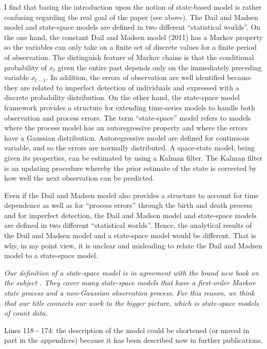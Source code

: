 \documentclass[12pt,english]{article}
\begin{document}
\begin{spacing}{1.9}
\begin{flushleft}
I find that basing the introduction upon the notion of state-based model is rather confusing
regarding the real goal of the paper (see above). The Dail and Madsen model and state-space
models are defined in two different ``statistical worlds''. On the one hand, the constant
Dail and Madsen model (2011) has a Markov property so the variables can only take on a
finite set of discrete values for a finite period of observation. The distinguish feature of
Markov chains is that the conditional probability of $x_{t}$ given the entire past depends only on
the immediately preceding variable $x_{t-1}$. In addition, the errors of observation are well
identified because they are related to imperfect detection of individuals and expressed with
a discrete probability distribution. On the other hand, the state-space model framework
provides a structure for extending time-series models to handle both observation and
process errors. The term ``state-space'' model refers to models where the process model has
an autoregressive property and where the errors have a Gaussian distribution.
Autoregressive model are defined for continuous variable, and so the errors are normally
distributed. A space-state model, being given its properties, can be estimated by using a
Kalman filter. The Kalman filter is an updating procedure whereby the prior estimate of the
state is corrected by how well the next observation can be predicted.

Even if the Dail and Madsen model also provides a structure to account for time dependence
as well as for ``process errors'' through the birth and death process and for imperfect
detection, the Dail and Madsen model and state-space models are defined in two different
``statistical worlds''. Hence, the analytical results of the Dail and Madsen model and a state-space
model would be different. That is why, in my point view, it is unclear and misleading to
relate the Dail and Madsen model to a state-space model.

\vspace{0.5cm}
\textit{Our definition of a state-space model is in agreement with the brand new
book on the subject \citep{newman_etal:2014}. They cover many state-space 
models that have
a first-order Markov state process and a non-Gaussian
observation process. For this reason, we think that our title connects
our work to the bigger picture, which is state-space
models of count data.} 
\vspace{0.5cm}

Lines 118 - 174: the description of the model could be shortened (or moved in part in the
appendices) because it has been described now in further publications.


\end{flushleft}
\end{spacing}
\end{document}
